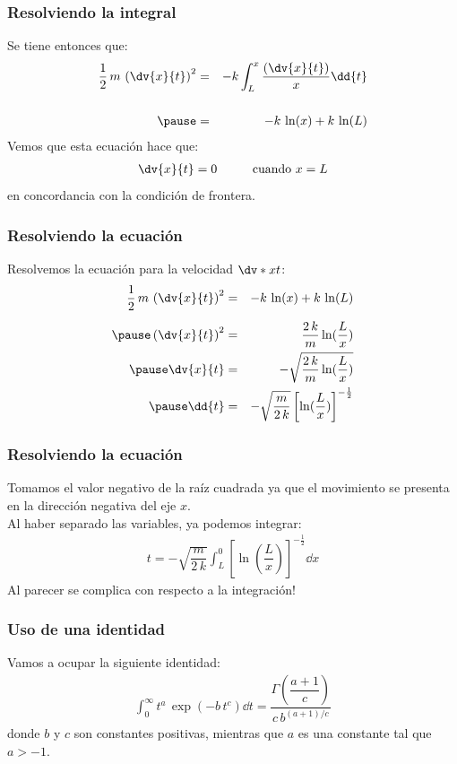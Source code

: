 \begin{frame}
\frametitle{Resolviendo la integral}
Se tiene entonces que:
\begin{eqnarray*}
\dfrac{1}{2} \, m \, \left( \dv{x}{t} \right)^{2} &=& - k \int_{L}^{x} \dfrac{\left( \dv{x}{t} \right)}{x} \dd{t} \\[0.5cm] \pause
&=& - k \, \ln(x) + k \, \ln(L)
\end{eqnarray*}
\pause
Vemos que esta ecuación hace que:
\begin{align*}
\dv{x}{t} = 0 \hspace{1cm} \mbox{cuando } x = L
\end{align*}
en concordancia con la condición de frontera.
\end{frame}
\begin{frame}
\frametitle{Resolviendo la ecuación}
Resolvemos la ecuación para la velocidad $\dv*{x}{t}$:
\begin{eqnarray*}
\dfrac{1}{2} \, m \, \left( \dv{x}{t} \right)^{2} &=& - k \, \ln(x) + k \, \ln(L) \\[0.5em] \pause
\left( \dv{x}{t} \right)^{2} &=& \dfrac{2 \, k}{m} \ln(\dfrac{L}{x}) \\[0.em] \pause
\dv{x}{t} &=& - \sqrt{\dfrac{2 \, k}{m} \ln(\dfrac{L}{x})} \\[0.em] \pause
\dd{t} &=& - \sqrt{\dfrac{m}{2 \, k}} \left[ \ln(\dfrac{L}{x}) \right]^{-\frac{1}{2}}
\end{eqnarray*}
\end{frame}
\begin{frame}
\frametitle{Resolviendo la ecuación}
Tomamos el valor negativo de la raíz cuadrada ya que el movimiento se presenta en la dirección negativa del eje $x$.
\\
\bigskip
\pause
Al haber separado las variables, ya podemos integrar:
\begin{align*}
t = - \sqrt{\dfrac{m}{2 \, k}} \int_{L}^{0} \left[ \ln(\dfrac{L}{x}) \right]^{-\frac{1}{2}} \dd{x}
\end{align*}
\pause
Al parecer se complica con respecto a la integración!
\end{frame}
\begin{frame}
\frametitle{Uso de una identidad}
Vamos a ocupar la siguiente identidad:
\begin{align}
\int_{0}^{\infty} t^{a} \, \exp(-b \, t^{c}) \dd{t} = \dfrac{\Gamma \left( \dfrac{a + 1}{c} \right)}{c \, b^{(a+1)/c}}
\label{eq:identidad_Gamma}
\end{align}
donde $b$ y $c$ son constantes positivas, mientras que $a$ es una constante tal que $a > - 1$.
\end{frame}
